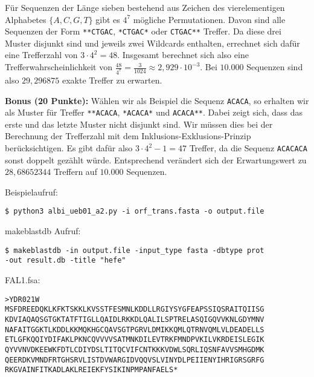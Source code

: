 \documentclass{homework}
\date{Montag, dem 22. Oktober 2012}
\author{Stefan Meißner (4279113) und Niels Hoppe (4356370)}
\begin{document}
\maketitle
\begin{enumerate} 


Für Sequenzen der Länge sieben bestehend aus Zeichen des vierelementigen Alphabetes $\{A,C,G,T\}$ gibt es $4^7$ mögliche Permutationen.
Davon sind alle Sequenzen der Form \texttt{**CTGAC}, \texttt{*CTGAC*} oder \texttt{CTGAC**} Treffer.
Da diese drei Muster disjunkt sind und jeweils zwei Wildcards enthalten,
errechnet sich dafür eine Trefferzahl von $3 \cdot 4^2 = 48$.
Insgesamt berechnet sich also eine Trefferwahrscheinlichkeit von $\frac{48}{4^7} = \frac{3}{1024} \approx 2,929 \cdot 10^{-3}$.
Bei $10.000$ Sequenzen sind also $29,296875$ exakte Treffer zu erwarten.

\textbf{Bonus (20 Punkte):} Wählen wir als Beispiel die Sequenz \texttt{ACACA},
so erhalten wir als Muster für Treffer \texttt{**ACACA}, \texttt{*ACACA*} und \texttt{ACACA**}.
Dabei zeigt sich, dass das erste und das letzte Muster nicht disjunkt sind.
Wir müssen dies bei der Berechnung der Trefferzahl mit dem Inklusions-Exklusions-Prinzip berücksichtigen.
Es gibt dafür also $3 \cdot 4^2 - 1 = 47$ Treffer, da die Sequenz \texttt{ACACACA} sonst doppelt gezählt würde.
Entsprechend verändert sich der Erwartungswert zu $28,68652344$ Treffern auf $10.000$ Sequenzen.




Beispielaufruf:

\begin{verbatim}
$ python3 albi_ueb01_a2.py -i orf_trans.fasta -o output.file
\end{verbatim}


makeblastdb Aufruf:
\begin{verbatim}
$ makeblastdb -in output.file -input_type fasta -dbtype prot
-out result.db -title "hefe"
\end{verbatim}

FAL1.fsa:
\begin{verbatim}
>YDR021W 
MSFDREEDQKLKFKTSKKLKVSSTFESMNLKDDLLRGIYSYGFEAPSSIQSRAITQIISG 
KDVIAQAQSGTGKTATFTIGLLQAIDLRKKDLQALILSPTRELASQIGQVVKNLGDYMNV 
NAFAITGGKTLKDDLKKMQKHGCQAVSGTPGRVLDMIKKQMLQTRNVQMLVLDEADELLS 
ETLGFKQQIYDIFAKLPKNCQVVVVSATMNKDILEVTRKFMNDPVKILVKRDEISLEGIK 
QYVVNVDKEEWKFDTLCDIYDSLTITQCVIFCNTKKKVDWLSQRLIQSNFAVVSMHGDMK 
QEERDKVMNDFRTGHSRVLISTDVWARGIDVQQVSLVINYDLPEIIENYIHRIGRSGRFG 
RKGVAINFITKADLAKLREIEKFYSIKINPMPANFAELS*
\end{verbatim}


\end{enumerate}
\end{document}
